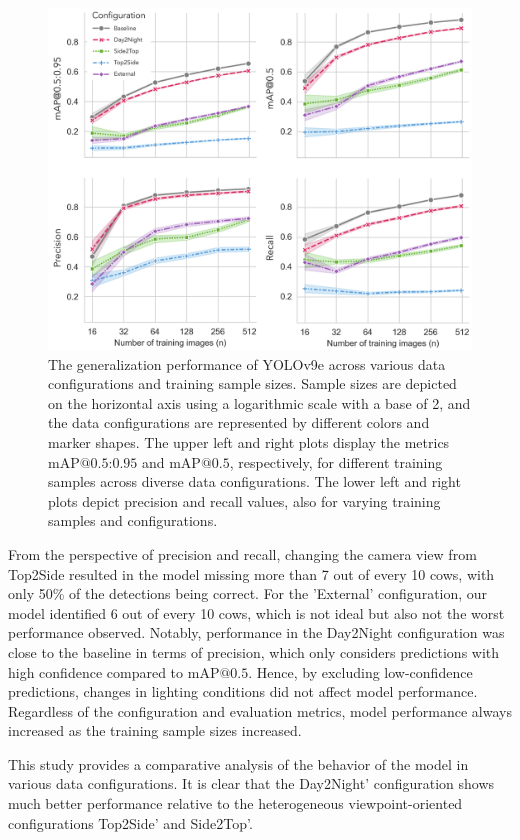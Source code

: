 \begin{figure}[H]
    \centerline{\includegraphics[width=0.8\columnwidth]{figure_3.jpg}}
    \caption{The generalization performance of YOLOv9e across various data configurations and training sample sizes. Sample sizes are depicted on the horizontal axis using a logarithmic scale with a base of 2, and the data configurations are represented by different colors and marker shapes. The upper left and right plots display the metrics $\text{mAP@{0.5:0.95}}$ and $\text{mAP@{0.5}}$, respectively, for different training samples across diverse data configurations. The lower left and right plots depict precision and recall values, also for varying training samples and configurations.}
    \label{fig:schemes}
\end{figure}

From the perspective of precision and recall, changing the camera view from Top2Side resulted in the model missing more than 7 out of every 10 cows, with only 50\% of the detections being correct. For the 'External' configuration, our model identified 6 out of every 10 cows, which is not ideal but also not the worst performance observed. Notably, performance in the Day2Night configuration was close to the baseline in terms of precision, which only considers predictions with high confidence compared to $\text{mAP@{0.5}}$. Hence, by excluding low-confidence predictions, changes in lighting conditions did not affect model performance. Regardless of the configuration and evaluation metrics, model performance always increased as the training sample sizes increased.

This study provides a comparative analysis of the behavior of the model in various data configurations. It is clear that the Day2Night' configuration shows much better performance relative to the heterogeneous viewpoint-oriented configurations Top2Side' and Side2Top'.


